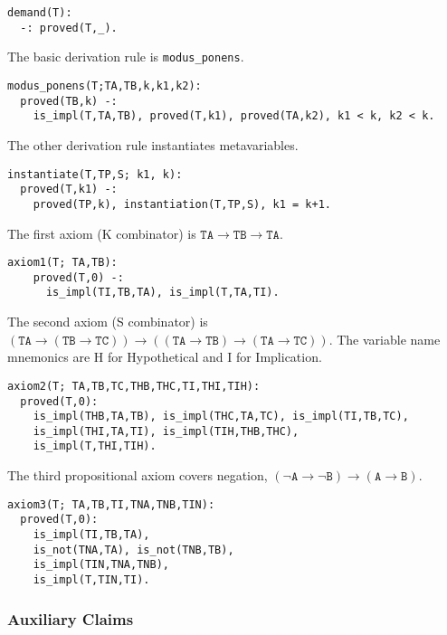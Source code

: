 \documentclass{article}
\theoremstyle{plain}
\theoremstyle{definition}
\begin{document}
\begin{verbatim}
demand(T):
  -: proved(T,_).
\end{verbatim}

The basic derivation rule is \texttt{modus\_ponens}.

\begin{verbatim}
modus_ponens(T;TA,TB,k,k1,k2):
  proved(TB,k) -:
    is_impl(T,TA,TB), proved(T,k1), proved(TA,k2), k1 < k, k2 < k.
\end{verbatim}

The other derivation rule instantiates metavariables.

\begin{verbatim}
instantiate(T,TP,S; k1, k):
  proved(T,k1) -:
    proved(TP,k), instantiation(T,TP,S), k1 = k+1.
\end{verbatim}

The first axiom (K combinator) is
$\texttt{TA}\rightarrow\texttt{TB}\rightarrow\texttt{TA}$.

\begin{verbatim}
axiom1(T; TA,TB):
    proved(T,0) -:
      is_impl(TI,TB,TA), is_impl(T,TA,TI).
\end{verbatim}

The second axiom (S combinator) is
$(\texttt{TA}\rightarrow(\texttt{TB}\rightarrow\texttt{TC}))\rightarrow((\texttt{TA}\rightarrow\texttt{TB})\rightarrow(\texttt{TA}\rightarrow\texttt{TC}))$.
The variable name mnemonics are H for Hypothetical and I for Implication.

\begin{verbatim}
axiom2(T; TA,TB,TC,THB,THC,TI,THI,TIH):
  proved(T,0):
    is_impl(THB,TA,TB), is_impl(THC,TA,TC), is_impl(TI,TB,TC),
    is_impl(THI,TA,TI), is_impl(TIH,THB,THC),
    is_impl(T,THI,TIH).
\end{verbatim}

The third propositional axiom covers negation,
$(\neg\texttt{A}\rightarrow\neg\texttt{B})\rightarrow(\texttt{A}\rightarrow\texttt{B})$.

\begin{verbatim}
axiom3(T; TA,TB,TI,TNA,TNB,TIN):
  proved(T,0):
    is_impl(TI,TB,TA),
    is_not(TNA,TA), is_not(TNB,TB),
    is_impl(TIN,TNA,TNB),
    is_impl(T,TIN,TI).
\end{verbatim}

\subsubsection{Auxiliary Claims}\label{auxiliary-claims}
\end{document}

